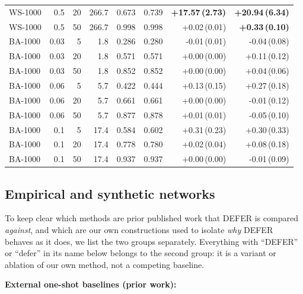 \documentclass[preprint,11pt]{elsarticle}
\theoremstyle{definition}
\theoremstyle{remark}
\begin{document}
\begin{table}[h]
\begin{tabular}{lrrrrrrr}
WS-1000 & 0.5 & 20 & 266.7 & 0.673 & 0.739 & \textbf{+17.57\,(2.73)} & \textbf{+20.94\,(6.34)} \\
WS-1000 & 0.5 & 50 & 266.7 & 0.998 & 0.998 & +0.02\,(0.01) & \textbf{+0.33\,(0.10)} \\
BA-1000 & 0.03 & 5 & 1.8 & 0.286 & 0.280 & -0.01\,(0.01) & -0.04\,(0.08) \\
BA-1000 & 0.03 & 20 & 1.8 & 0.571 & 0.571 & +0.00\,(0.00) & +0.11\,(0.12) \\
BA-1000 & 0.03 & 50 & 1.8 & 0.852 & 0.852 & +0.00\,(0.00) & +0.04\,(0.06) \\
BA-1000 & 0.06 & 5 & 5.7 & 0.422 & 0.444 & +0.13\,(0.15) & +0.27\,(0.18) \\
BA-1000 & 0.06 & 20 & 5.7 & 0.661 & 0.661 & +0.00\,(0.00) & -0.01\,(0.12) \\
BA-1000 & 0.06 & 50 & 5.7 & 0.877 & 0.878 & +0.01\,(0.01) & -0.05\,(0.10) \\
BA-1000 & 0.1 & 5 & 17.4 & 0.584 & 0.602 & +0.31\,(0.23) & +0.30\,(0.33) \\
BA-1000 & 0.1 & 20 & 17.4 & 0.778 & 0.780 & +0.02\,(0.04) & +0.08\,(0.18) \\
BA-1000 & 0.1 & 50 & 17.4 & 0.937 & 0.937 & +0.00\,(0.00) & -0.01\,(0.09) \\
\hline
\end{tabular}
\end{table}

\subsection{Empirical and synthetic networks}\label{sec:defer-experiments}

To keep clear which methods are prior published work that DEFER is
compared \emph{against}, and which are our own constructions used to
isolate \emph{why} DEFER behaves as it does, we list the two groups
separately. Everything with ``DEFER'' or ``defer'' in its name below
belongs to the second group: it is a variant or ablation of our own
method, not a competing baseline.

\noindent\textbf{External one-shot baselines (prior work):}
\end{document}
